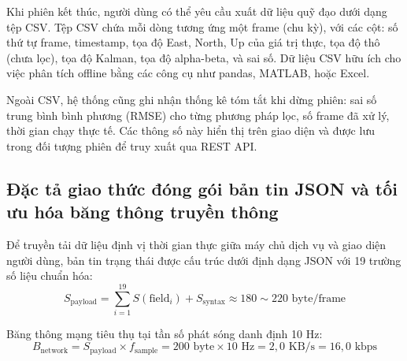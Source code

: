 Khi phiên kết thúc, người dùng có thể yêu cầu xuất dữ liệu quỹ đạo dưới dạng tệp CSV. Tệp CSV chứa mỗi dòng tương ứng một frame (chu kỳ), với các cột: số thứ tự frame, timestamp, tọa độ East, North, Up của giá trị thực, tọa độ thô (chưa lọc), tọa độ Kalman, tọa độ alpha-beta, và sai số. Dữ liệu CSV hữu ích cho việc phân tích offline bằng các công cụ như pandas, MATLAB, hoặc Excel.

Ngoài CSV, hệ thống cũng ghi nhận thống kê tóm tắt khi dừng phiên: sai số trung bình bình phương (RMSE) cho từng phương pháp lọc, số frame đã xử lý, thời gian chạy thực tế. Các thông số này hiển thị trên giao diện và được lưu trong đối tượng phiên để truy xuất qua REST API.

\subsection{Đặc tả giao thức đóng gói bản tin JSON và tối ưu hóa băng thông truyền thông}

\hspace{0.5cm} Để truyền tải dữ liệu định vị thời gian thực giữa máy chủ dịch vụ và giao diện người dùng, bản tin trạng thái được cấu trúc dưới định dạng JSON với 19 trường số liệu chuẩn hóa:
\begin{equation}
S_{\text{payload}} = \sum_{i=1}^{19} S(\text{field}_i) + S_{\text{syntax}} \approx 180 \sim 220\text{ byte/frame}
\label{eq:json-payload-size-formula}
\end{equation}

Băng thông mạng tiêu thụ tại tần số phát sóng danh định 10 Hz:
\begin{equation}
B_{\text{network}} = S_{\text{payload}} \times f_{\text{sample}} = 200\text{ byte} \times 10\text{ Hz} = 2{,}0\text{ KB/s} = 16{,}0\text{ kbps}
\label{eq:bandwidth-consumption-formula}
\end{equation}

